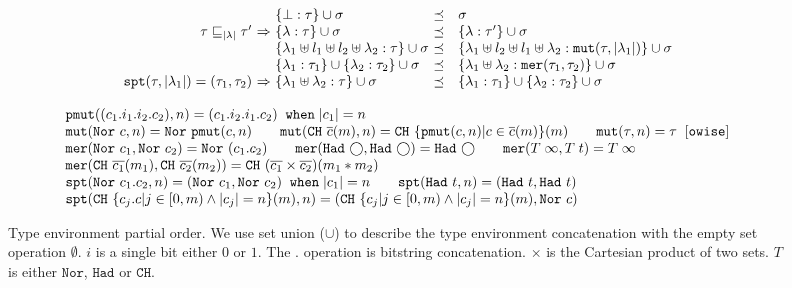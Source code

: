 \begin{figure}
{\small
\begin{center}
 \[
  \begin{array}{r@{~}c@{~}l@{~}cl}
  &&\{\bot:\tau\} \cup \sigma &\preceq& \sigma\\
  \tau\sqsubseteq_{\slen{\lambda}}\tau' &\Rightarrow& \{\lambda:\tau\} \cup \sigma &\preceq& \{\lambda:\tau'\} \cup \sigma\\
  &&\{\lambda_1\uplus l_1 \uplus l_2 \uplus \lambda_2 :\tau\} \cup \sigma &\preceq& \{\lambda_1\uplus l_2 \uplus l_1 \uplus \lambda_2 : \texttt{mut}(\tau,\slen{\lambda_1})\} \cup \sigma\\
  &&\{\lambda_1 :\tau_1\} \cup \{\lambda_2 :\tau_2\} \cup \sigma &\preceq& \{\lambda_1 \uplus \lambda_2 :\texttt{mer}(\tau_1,\tau_2)\} \cup \sigma \\
  \texttt{spt}(\tau,\slen{\lambda_1})=(\tau_1,\tau_2)&\Rightarrow&\{\lambda_1 \uplus \lambda_2 :\tau\} \cup \sigma &\preceq& \{\lambda_1 :\tau_1\} \cup \{\lambda_2 :\tau_2\} \cup \sigma
    \end{array}
  \]
\end{center}
{\footnotesize
\[
\begin{array}{l}
\texttt{pmut}((c_1.i_1.i_2.c_2),n)=(c_1.i_2.i_1.c_2) \;\;\texttt{when}\;|c_1|=n
\\
\texttt{mut}(\texttt{Nor}~{c},n)=\texttt{Nor}~{\texttt{pmut}(c,n)}
\qquad
\texttt{mut}(\texttt{CH}~{\overline{c}(m)},n)=\texttt{CH}~{\{\texttt{pmut}(c,n)|c\in\overline{c}(m)\}(m)}
\qquad
\texttt{mut}(\tau,n)=\tau\;\;[\texttt{owise}]
\\
\texttt{mer}(\texttt{Nor}~{c_1},\texttt{Nor}~{c_2})=\texttt{Nor}~{(c_1.c_2)}
\qquad
\texttt{mer}(\texttt{Had}~{\bigcirc},\texttt{Had}~{\bigcirc})=\texttt{Had}~{\bigcirc}
\qquad
\texttt{mer}(T\;\infty,T\;t)=T\;\infty
\\
\texttt{mer}(\texttt{CH}~{\overline{c_1}(m_1)},\texttt{CH}~{\overline{c_2}(m_2)})=\texttt{CH}~{(\overline{c_1}\times \overline{c_2})(m_1*m_2)}
\\
\texttt{spt}(\texttt{Nor}~{c_1.c_2},n)=(\texttt{Nor}~{c_1},\texttt{Nor}~{c_2}) \;\;\texttt{when}\;|c_1|=n
\qquad
\texttt{spt}(\texttt{Had}~{t},n)=(\texttt{Had}~{t},\texttt{Had}~{t})
\\
\texttt{spt}(\texttt{CH}~{\{c_j.c|j\in [0,m)\wedge |c_j|=n\}(m)},n)=(\texttt{CH}~{\{c_j|j\in [0,m)\wedge |c_j|=n\}(m)},\texttt{Nor}~{c})
\end{array}
\]
}
\caption{Type environment partial order. We use set union ($\cup$) to describe the type environment concatenation with the empty set operation $\emptyset$. $i$ is a single bit either $0$ or $1$. The $.$ operation is bitstring concatenation. $\times$ is the Cartesian product of two sets.
$T$ is either $\texttt{Nor}$, $\texttt{Had}$ or $\texttt{CH}$. }
  \label{fig:env-equiv}
}
\end{figure}

